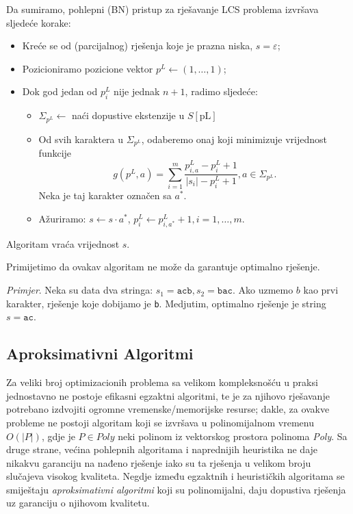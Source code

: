 \documentclass[a4paper, utf8, 11pt, colorlinks]{article}
\begin{document}
\noindent Da sumiramo, pohlepni (BN) pristup za rješavanje LCS problema izvršava sljedeće korake:
\begin{itemize}
	\item Kreće se od (parcijalnog) rješenja koje je prazna niska, $s=\varepsilon$;
	\item Pozicioniramo pozicione vektor $p^L \gets (1,\ldots, 1) $;
	\item Dok god jedan od $p^L_i$ nije jednak $n+1$, radimo sljedeće: 
	\begin{itemize}
   	     \item $\Sigma_{p^L} \gets$ naći dopustive ekstenzije u $S[\textrm{pL}]$
	      \item Od svih karaktera u $\Sigma_{p^L}$, odaberemo onaj koji minimizuje vrijednost funkcije 
	      $$g( p^L,a) = \sum_{i=1}^m\frac{p^L_{i,a} - p^L_i + 1 }{|s_i| - p^L_i + 1 }, a \in \Sigma_{ p^L }.$$
	      Neka je taj karakter označen sa $a^*$. 
	      \item Ažuriramo: $s \gets  s \cdot a^*$, $p^L_i \gets p^L_{i, a^*} +1, i = 1,\ldots,m.$
    \end{itemize}
\end{itemize}
Algoritam vraća vrijednost $s$. 

Primijetimo da ovakav algoritam ne može da garantuje optimalno rješenje. 

\noindent \emph{Primjer}.  Neka su data dva stringa: $s_1 = \texttt{acb}, s_2 = \texttt{bac}$. Ako uzmemo  $ b$ kao prvi karakter, rješenje koje dobijamo je \texttt{b}. Medjutim, optimalno rješenje je string $s=\texttt{ac}$. 

\subsection{Aproksimativni Algoritmi}
  
   Za veliki broj optimizacionih problema sa velikom kompleksnošću u praksi jednostavno ne postoje efikasni egzaktni algoritmi, te je za  njihovo rješavanje potrebano izdvojiti ogromne vremenske/memorijske resurse; dakle, za  ovakve probleme ne postoji algoritam koji se izvršava u polinomijalnom vremenu $O(|P|)$, gdje je $P \in {Poly}$ neki polinom iz vektorskog prostora polinoma \emph{Poly}. Sa druge strane, većina pohlepnih algoritama i naprednijih heuristika ne daje nikakvu garanciju na nađeno rješenje iako su ta rješenja u velikom broju slučajeva visokog kvaliteta. Negdje između egzaktnih i heurističkih algoritama se smiještaju \emph{aproksimativni algoritmi} koji su polinomijalni, daju dopustiva rješenja uz garanciju o njihovom kvalitetu. 
  
\end{document}
